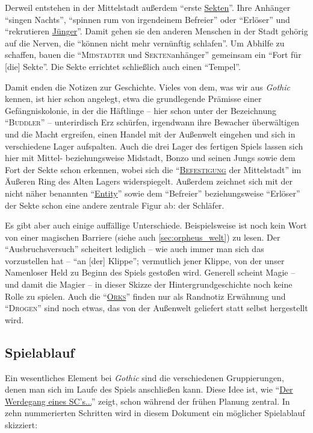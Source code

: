 \documentclass[a5paper,pagesize,numbers=noenddot]{scrbook}
\begin{document}
Derweil entstehen in der Mittelstadt außerdem \enquote{erste \uline{Sekten}}.
Ihre Anhänger \enquote{singen Nachts}, \enquote{spinnen rum von irgendeinem Befreier} oder \enquote{Erlöser} und \enquote{rekrutieren \uline{Jünger}}.
Damit gehen sie den anderen Menschen in der Stadt gehörig auf die Nerven, die \enquote{können nicht mehr vernünftig schlafen}.
Um Abhilfe zu schaffen, bauen die \enquote{\textsc{Midstädter} und \textsc{Sekten}anhänger} gemeinsam ein \enquote{Fort für [die] Sekte}.
Die Sekte errichtet schließlich auch einen \enquote{Tempel}.

Damit enden die Notizen zur Geschichte.
Vieles von dem, was wir aus \textit{Gothic} kennen, ist hier schon angelegt, etwa die grundlegende Prämisse einer Gefängniskolonie, in der die Häftlinge -- hier schon unter der Bezeichnung \enquote{\textsc{Buddler}} -- unterirdisch Erz schürfen, irgendwann ihre Bewacher überwältigen und die Macht ergreifen, einen Handel mit der Außenwelt eingehen und sich in verschiedene Lager aufspalten.
Auch die drei Lager des fertigen Spiels lassen sich hier mit Mittel- beziehungsweise Midstadt, Bonzo und seinen Jungs sowie dem Fort der Sekte schon erkennen, wobei sich die \enquote{\textsc{\uline{Befestigung}} der Mittelstadt} im Äußeren Ring des Alten Lagers widerspiegelt.
Außerdem zeichnet sich mit der nicht näher benannten \enquote{\uline{Entity}} sowie dem \enquote{Befreier} beziehungsweise \enquote{Erlöser} der Sekte schon eine andere zentrale Figur ab: der Schläfer.

Es gibt aber auch einige auffällige Unterschiede.
Beispielsweise ist noch kein Wort von einer magischen Barriere (siehe auch \autoref{sec:orpheus_welt}) zu lesen.
Der \enquote{Ausbruchsversuch} scheitert lediglich -- wie auch immer man sich das vorzustellen hat -- \enquote{an [der] Klippe}; vermutlich jener Klippe, von der unser Namenloser Held zu Beginn des Spiels gestoßen wird.
Generell scheint Magie -- und damit die Magier -- in dieser Skizze der Hintergrundgeschichte noch keine Rolle zu spielen.
Auch die \enquote{\textsc{\uline{Orks}}} finden nur als Randnotiz Erwähnung und \enquote{\textsc{Drogen}} sind noch etwas, das von der Außenwelt geliefert statt selbst hergestellt wird.


\subsection{Spielablauf}\label{sec:orpheus_geschichte_spielablauf}
Ein wesentliches Element bei \textit{Gothic} sind die verschiedenen Gruppierungen, denen man sich im Laufe des Spiels anschließen kann.
Diese Idee ist, wie \enquote{\uline{Der Werdegang eines SC's...}} zeigt, schon während der frühen Planung zentral.
In zehn nummerierten Schritten wird in diesem Dokument ein möglicher Spielablauf skizziert:
\end{document}
